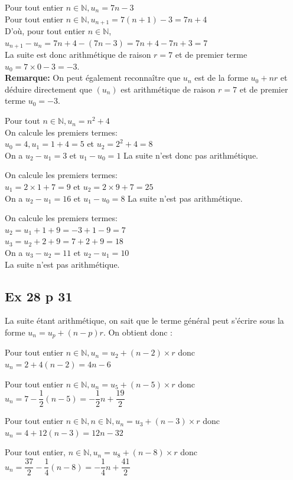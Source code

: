 \documentclass[a4paper,french]{book}
\begin{document}
\begin{enumMet}
    \item Pour tout entier $n \in \mathbb{N}, u_{n}=7 n-3$\\
    Pour tout entier $n \in \mathbb{N}, u_{n+1}=7(n+1)-3=7 n+4$\\
    D'où, pour tout entier $n \in \mathbb{N}$, $u_{n+1}-u_{n}=7 n+4-(7 n-3)=7 n+4-7 n+3=7$\\
    La suite est donc arithmétique de raison $r=7$ et de premier terme $u_{0}=7\times0-3=-3$.\\
    \textbf{Remarque:} On peut également reconnaître que $u_{n}$ est de la forme $u_{0}+n r$ et déduire directement que $\left(u_{n}\right)$ est arithmétique de raison $r=7$ et de premier terme $u_{0}=-3$.
    \item Pour tout $n \in \mathbb{N}, u_{n}=n^{2}+4$\\
    On calcule les premiers termes:\\
    $u_{0}=4, u_{1}=1+4=5$ et $u_{2}=2^{2}+4=8$\\
    On a $u_{2}-u_{1}=3$ et $u_{1}-u_{0}=1$ La suite n'est donc pas arithmétique.
    \item On calcule les premiers termes:\\
    $u_{1}=2 \times 1+7=9$ et $u_{2}=2 \times 9+7=25$\\
    On a $u_{2}-u_{1}=16$ et $u_{1}-u_{0}=8$ La suite n'est pas arithmétique.
    \item On calcule les premiers termes:\\
    $u_{2}=u_{1}+1+9=-3+1-9=7$\\
    $u_{3}=u_{2}+2+9=7+2+9=18$\\
    On a $u_{3}-u_{2}=11$ et $u_{2}-u_{1}=10$\\
    La suite n'est pas arithmétique.
\end{enumMet}

\subsection*{Ex 28 p 31}

La suite étant arithmétique, on sait que le terme général peut s'écrire sous la forme $u_{n}=u_{p}+(n-p) r$. On obtient donc :
\begin{enumMet}
    \item Pour tout entier $n \in \mathbb{N}, u_{n}=u_{2}+(n-2) \times r$ donc $u_{n}=2+4(n-2)=4 n-6$
    \item Pour tout entier $n \in \mathbb{N}, u_{n}=u_{5}+(n-5) \times r$ donc $u_{n}=7-\dfrac{1}{2}(n-5)=-\dfrac{1}{2} n+\dfrac{19}{2}$
    \item Pour tout entier $n \in \mathbb{N}, n \in \mathbb{N}, u_{n}=u_{3}+(n-3) \times r$ donc
    $u_{n}=4+12(n-3)=12 n-32$
    \item Pour tout entier, $n \in \mathbb{N}, u_{n}=u_{8}+(n-8) \times r$ donc $u_{n}=\dfrac{37}{2}-\dfrac{1}{4}(n-8)=-\dfrac{1}{4} n+\dfrac{41}{2}$
\end{enumMet}
\end{document}
